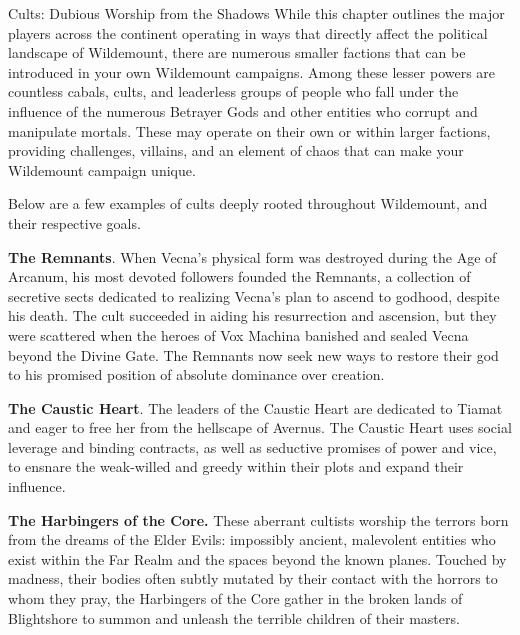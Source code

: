 \documentclass[10pt,a4paper,twoside,bg=print,twocolumn,openany,nodeprecatedcode]{dndbook}
\begin{document}
\begin{DndSidebar}[float=!b]{Cults: Dubious Worship from the Shadows}
While this chapter outlines the major players across the continent operating in ways that directly affect the political landscape of Wildemount, there are numerous smaller factions that can be introduced in your own Wildemount campaigns. Among these lesser powers are countless cabals, cults, and leaderless groups of people who fall under the influence of the numerous Betrayer Gods and other entities who corrupt and manipulate mortals. These may operate on their own or within larger factions, providing challenges, villains, and an element of chaos that can make your Wildemount campaign unique.



Below are a few examples of cults deeply rooted throughout Wildemount, and their respective goals.



\textbf{The Remnants}. When Vecna's physical form was destroyed during the Age of Arcanum, his most devoted followers founded the Remnants, a collection of secretive sects dedicated to realizing Vecna's plan to ascend to godhood, despite his death. The cult succeeded in aiding his resurrection and ascension, but they were scattered when the heroes of Vox Machina banished and sealed Vecna beyond the Divine Gate. The Remnants now seek new ways to restore their god to his promised position of absolute dominance over creation.



\textbf{The Caustic Heart}. The leaders of the Caustic Heart are dedicated to Tiamat and eager to free her from the hellscape of Avernus. The Caustic Heart uses social leverage and binding contracts, as well as seductive promises of power and vice, to ensnare the weak-willed and greedy within their plots and expand their influence.



\textbf{The Harbingers of the Core.} These aberrant cultists worship the terrors born from the dreams of the Elder Evils: impossibly ancient, malevolent entities who exist within the Far Realm and the spaces beyond the known planes. Touched by madness, their bodies often subtly mutated by their contact with the horrors to whom they pray, the Harbingers of the Core gather in the broken lands of Blightshore to summon and unleash the terrible children of their masters.



\end{DndSidebar}
\end{document}
